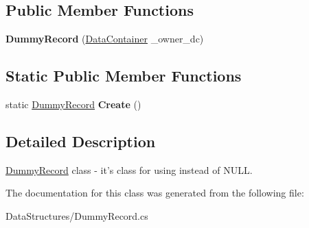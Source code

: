 \subsection*{Public Member Functions}
\begin{DoxyCompactItemize}
\item 
\hypertarget{class_dwarf_d_b_1_1_data_structures_1_1_dummy_record_a78c4178cf8500869469b99645050e2ec}{
{\bfseries DummyRecord} (\hyperlink{class_dwarf_d_b_1_1_data_structures_1_1_data_container}{DataContainer} \_\-owner\_\-dc)}
\label{class_dwarf_d_b_1_1_data_structures_1_1_dummy_record_a78c4178cf8500869469b99645050e2ec}

\end{DoxyCompactItemize}
\subsection*{Static Public Member Functions}
\begin{DoxyCompactItemize}
\item 
\hypertarget{class_dwarf_d_b_1_1_data_structures_1_1_dummy_record_a8fa625aa183e039b3a7c9ca365f2b7f7}{
static \hyperlink{class_dwarf_d_b_1_1_data_structures_1_1_dummy_record}{DummyRecord} {\bfseries Create} ()}
\label{class_dwarf_d_b_1_1_data_structures_1_1_dummy_record_a8fa625aa183e039b3a7c9ca365f2b7f7}

\end{DoxyCompactItemize}


\subsection{Detailed Description}
\hyperlink{class_dwarf_d_b_1_1_data_structures_1_1_dummy_record}{DummyRecord} class -\/ it's class for using instead of NULL. 

The documentation for this class was generated from the following file:\begin{DoxyCompactItemize}
\item 
DataStructures/DummyRecord.cs\end{DoxyCompactItemize}
